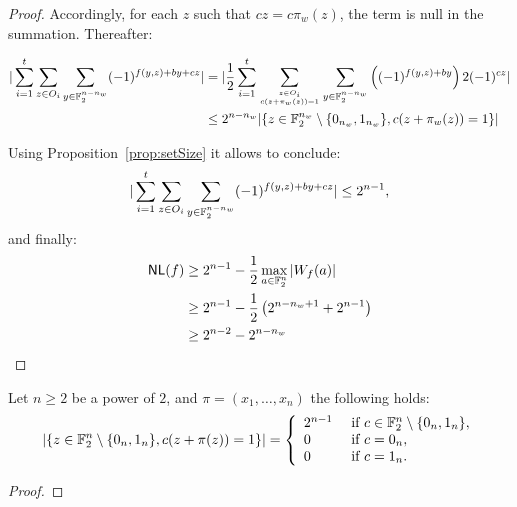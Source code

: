 \documentclass{llncs}
\begin{document}
\begin{proof}
Accordingly, for each $z$ such that $cz=c\pi_w(z)$, the term is null in the summation. Thereafter:

\begin{align*}|\sum_{i=1}^{t} \sum_{z\in O_i} \sum_{y\in \mathbb{F}_2^{n-n_w}}(-1)^{f(y,z)+by+cz}|&=|\frac{1}{2}\sum_{i=1}^{t} \sum_{z\in O_i \atop {c(z+\pi_w(z))=1}} \sum_{y\in \mathbb{F}_2^{n-n_w}} \left((-1)^{f(y,z)+by}  \right)2(-1)^{cz}|\\
&\le 2^{n-n_w} |\{ z \in \mathbb{F}_2^{n_w} \setminus \{0_{n_w},1_{n_w}\},  c(z+\pi_w(z))=1   \}|
\end{align*}

Using Proposition~\ref{prop:setSize} it allows to conclude:
\[|\sum_{i=1}^{t} \sum_{z\in O_i} \sum_{y\in \mathbb{F}_2^{n-n_w}}(-1)^{f(y,z)+by+cz}|\le 2^{n-1},\]
and finally:
\begin{align*}
\mathsf{NL}(f)&\ge 2^{n-1}-\frac{1}{2} \max_{a\in \mathbb{F}_2^n}| W_{f}(a)|\\
&\ge 2^{n-1}-\frac{1}{2} \left(2^{n-n_w+1} + 2^{n-1}\right)\\
&\ge 2^{n-2} - 2^{n-n_w}
\end{align*} 




\end{proof}



\begin{proposition}\label{prop:setSize}
	Let $n\ge 2$ be a power of $2$, and $\pi= (x_1,\ldots,x_n)$ the following holds:
\[ |\{ z \in \mathbb{F}_2^{n} \setminus \{0_{n},1_{n}\},  c(z+\pi(z))=1   \}| 
= \left \{
\begin{array}{l l}
	2^{n-1}  & \text{ if } c \in \mathbb{F}_2^n \setminus \{0_n,1_n\}, \\
	0  & \text{ if } c=0_n,\\
	0 & \text{ if } c=1_n.
\end{array}\right.\]
	
\end{proposition}
\begin{proof}
	
\end{proof}






\ifnum{}
%


\else


\fi
\end{document}
